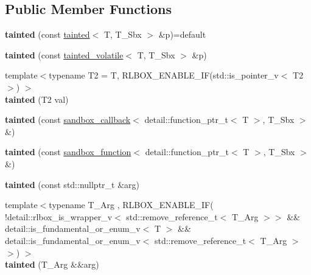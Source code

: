 \subsection*{Public Member Functions}
\begin{DoxyCompactItemize}
\item 
\mbox{\label{classrlbox_1_1tainted_a34833410f31fa9a60b663e4b7e2a28fe}} 
{\bfseries tainted} (const \hyperlink{classrlbox_1_1tainted}{tainted}$<$ T, T\+\_\+\+Sbx $>$ \&p)=default
\item 
\mbox{\label{classrlbox_1_1tainted_a7cadc0cd1fb715d719baadb7e2d87042}} 
{\bfseries tainted} (const \hyperlink{classrlbox_1_1tainted__volatile}{tainted\+\_\+volatile}$<$ T, T\+\_\+\+Sbx $>$ \&p)
\item 
\mbox{\label{classrlbox_1_1tainted_a56739db1ff21372093b8180af5778f88}} 
{\footnotesize template$<$typename T2  = T, R\+L\+B\+O\+X\+\_\+\+E\+N\+A\+B\+L\+E\+\_\+\+I\+F(std\+::is\+\_\+pointer\+\_\+v$<$ T2 $>$) $>$ }\\{\bfseries tainted} (T2 val)
\item 
\mbox{\label{classrlbox_1_1tainted_a06c24d3c7b8268ab42e244f45feb31ba}} 
{\bfseries tainted} (const \hyperlink{classrlbox_1_1sandbox__callback}{sandbox\+\_\+callback}$<$ detail\+::function\+\_\+ptr\+\_\+t$<$ T $>$, T\+\_\+\+Sbx $>$ \&)
\item 
\mbox{\label{classrlbox_1_1tainted_ac0513020c42df1f0389ba3ee1e58eb6b}} 
{\bfseries tainted} (const \hyperlink{classrlbox_1_1sandbox__function}{sandbox\+\_\+function}$<$ detail\+::function\+\_\+ptr\+\_\+t$<$ T $>$, T\+\_\+\+Sbx $>$ \&)
\item 
\mbox{\label{classrlbox_1_1tainted_a59d4309650ad2e5749cf7847aba8fc48}} 
{\bfseries tainted} (const std\+::nullptr\+\_\+t \&arg)
\item 
\mbox{\label{classrlbox_1_1tainted_a058af0c109aadb7740696f8583310994}} 
{\footnotesize template$<$typename T\+\_\+\+Arg , R\+L\+B\+O\+X\+\_\+\+E\+N\+A\+B\+L\+E\+\_\+\+I\+F( !detail\+::rlbox\+\_\+is\+\_\+wrapper\+\_\+v$<$ std\+::remove\+\_\+reference\+\_\+t$<$ T\+\_\+\+Arg $>$$>$ \&\& detail\+::is\+\_\+fundamental\+\_\+or\+\_\+enum\+\_\+v$<$ T $>$ \&\& detail\+::is\+\_\+fundamental\+\_\+or\+\_\+enum\+\_\+v$<$ std\+::remove\+\_\+reference\+\_\+t$<$ T\+\_\+\+Arg $>$$>$) $>$ }\\{\bfseries tainted} (T\+\_\+\+Arg \&\&arg)

\end{DoxyCompactItemize}
